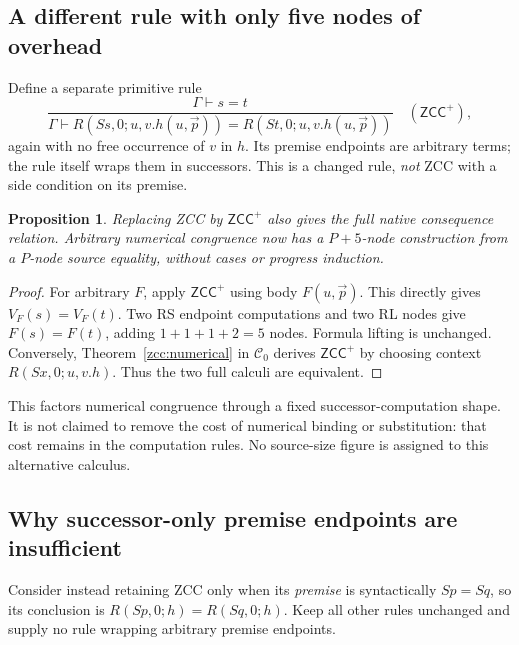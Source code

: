 \documentclass[11pt,letterpaper]{article}
\newtheorem{proposition}[theorem]{Proposition}
\theoremstyle{definition}\newtheorem{definition}[theorem]{Definition}
\theoremstyle{remark}\newtheorem{remark}[theorem]{Remark}
\begin{document}
\subsection{A different rule with only five nodes of overhead}

Define a separate primitive rule
\[
 \frac{\Gamma\vdash s=t}
 {\Gamma\vdash R(Ss,0;u,v.h(u,\vec p))=
                  R(St,0;u,v.h(u,\vec p))}
 \quad(\mathsf{ZCC}^{+}),
 \label{zcc:wrapped}
\]
again with no free occurrence of $v$ in $h$. Its premise endpoints are
arbitrary terms; the rule itself wraps them in successors. This is a
changed rule, \emph{not} ZCC with a side condition on its premise.

\begin{proposition}\label{zcc:wrapped-theorem}
Replacing ZCC by $\mathsf{ZCC}^{+}$ also gives the full native consequence
relation. Arbitrary numerical congruence now has a $P+5$-node construction
from a $P$-node source equality, without cases or progress induction.
\end{proposition}
\begin{proof}
For arbitrary $F$, apply $\mathsf{ZCC}^{+}$ using body $F(u,\vec p)$.
This directly gives $V_F(s)=V_F(t)$. Two RS endpoint computations and
two RL nodes give $F(s)=F(t)$, adding $1+1+1+2=5$ nodes.
Formula lifting is unchanged. Conversely, Theorem~\ref{zcc:numerical}
in $\mathcal C_0$ derives $\mathsf{ZCC}^{+}$ by choosing context
$R(Sx,0;u,v.h)$. Thus the two full calculi are equivalent.
\end{proof}

This factors numerical congruence through a fixed successor-computation
shape. It is not claimed to remove the cost of numerical binding or
substitution: that cost remains in the computation rules. No source-size
figure is assigned to this alternative calculus.

\subsection{Why successor-only premise endpoints are insufficient}

Consider instead retaining ZCC only when its \emph{premise} is syntactically
$Sp=Sq$, so its conclusion is $R(Sp,0;h)=R(Sq,0;h)$. Keep all other rules
unchanged and supply no rule wrapping arbitrary premise endpoints.
\end{document}
